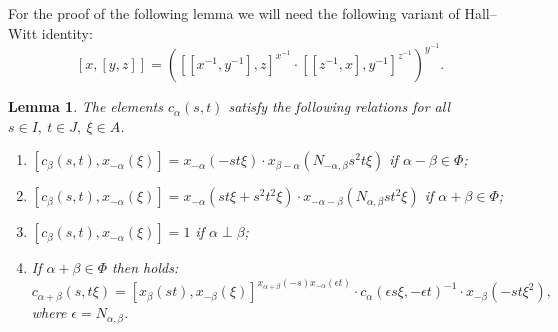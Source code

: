 \documentclass[oneside, 8pt]{amsart}
\newtheorem{lemma}{Lemma}
\theoremstyle{remark}
\theoremstyle{definition}
\numberwithin{equation}{section}
\begin{document}
For the proof of the following lemma we will need the following variant of Hall--Witt identity:
\begin{equation} \label{HW-variant} [x, [ y, z]] = \left([[ x^{-1}, y^{-1}], z] ^ {x^{-1}} \cdot  [[ z^{-1}, x], y^{-1}] ^ {z^{-1}}\right)^{y^{-1}}.\end{equation}

\begin{lemma} \label{Crels}
The elements $c_\alpha(s, t)$ satisfy the following relations for all $s\in I,\ t\in J,\ \xi\in A$.
 \begin{enumerate}
  \item \label{C1} $[c_\beta(s, t), x_{-\alpha}(\xi)] = x_{-\alpha}(- st\xi) \cdot x_{\beta-\alpha}(N_{-\alpha,\beta}s^2t\xi)$ if $\alpha-\beta \in \Phi$;
  \item \label{C2} $[c_\beta(s, t), x_{-\alpha}(\xi)] = x_{-\alpha}(st\xi + s^2t^2\xi) \cdot x_{-\alpha-\beta}(N_{\alpha, \beta}st^2\xi)$ if $\alpha+\beta \in \Phi$;
  \item \label{C3} $[c_\beta(s, t), x_{-\alpha}(\xi)] = 1$ if $\alpha \perp \beta$;
  \item \label{C4} If $\alpha+\beta\in\Phi$ then holds:
  \[c_{\alpha+\beta}(s, t\xi) = [x_{\beta}(st), x_{-\beta}(\xi)] ^ {x_{\alpha+\beta}(-s) x_{-\alpha}(\epsilon t)} \cdot c_{\alpha}(\epsilon s\xi, -\epsilon t)^{-1} \cdot x_{-\beta}(-st\xi^2),\]
  where $\epsilon = N_{\alpha,\beta}$.
 \end{enumerate}
\end{lemma}
\end{document}
